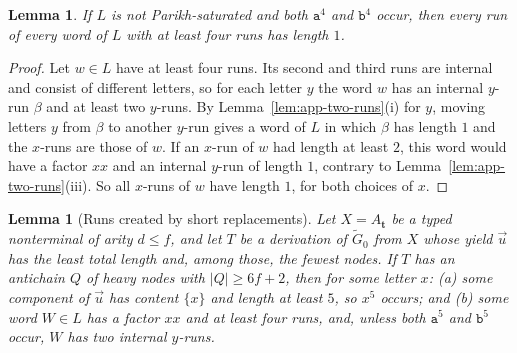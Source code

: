\documentclass[11pt]{article}
\numberwithin{equation}{section}
\theoremstyle{plain}
\newtheorem{lemma}[theorem]{Lemma}
\theoremstyle{definition}
\theoremstyle{remark}
\newcommand{\tuple}[1]{\vec{#1}}
\theoremstyle{plain}
\begin{document}
\begin{lemma}\label{lem:app-two-alternate}
If $L$ is not Parikh-saturated and both $\mathtt a^4$ and $\mathtt b^4$ occur,
then every run of every word of $L$ with at least four runs has length $1$.
\end{lemma}

\begin{proof}
Let $w\in L$ have at least four runs.  Its second and third runs are internal
and consist of different letters, so for each letter $y$ the word $w$ has an
internal $y$-run $\beta$ and at least two $y$-runs.  By
Lemma~\ref{lem:app-two-runs}(i) for $y$, moving letters $y$ from $\beta$ to another
$y$-run gives a word of $L$ in which $\beta$ has length $1$ and the $x$-runs are
those of $w$.  If an $x$-run of $w$ had length at least $2$, this word would
have a factor $xx$ and an internal $y$-run of length $1$, contrary to
Lemma~\ref{lem:app-two-runs}(iii).  So all $x$-runs of $w$ have length $1$, for
both choices of $x$.
\end{proof}

\begin{lemma}[Runs created by short replacements]\label{lem:app-two-insertion}
Let $X=A_{\mathbf t}$ be a typed nonterminal of arity $d\le f$, and let $T$ be a
derivation of $\widetilde G_0$ from $X$ whose yield $\tuple u$ has the least total
length and, among those, the fewest nodes.  If $T$ has an antichain $Q$ of
heavy nodes with $|Q|\ge6f+2$, then for some letter $x$:
\textup{(a)} some component of $\tuple u$ has content $\{x\}$ and length at least
$5$, so $x^5$ occurs; and
\textup{(b)} some word $W\in L$ has a factor $xx$ and at least four runs, and,
unless both $\mathtt a^5$ and $\mathtt b^5$ occur, $W$ has two internal $y$-runs.
\end{lemma}
\end{document}
